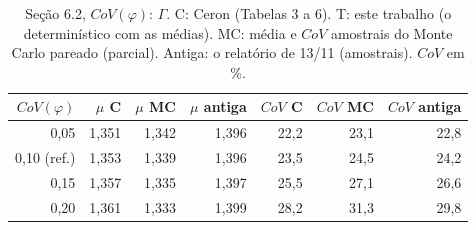 \begin{table}[htbp]\centering\scriptsize\setlength{\tabcolsep}{3pt}
\caption{Seção 6.2, $CoV(\varphi)$: $\Gamma$. C: Ceron (Tabelas 3 a 6). T: este trabalho (o determinístico com as médias). MC: média e $CoV$ amostrais do Monte Carlo pareado (parcial). Antiga: o relatório de 13/11 (amostrais). $CoV$ em \%.}\label{tab:g_covphi}
\begin{tabular}{rrrrrrr}\toprule
$CoV(\varphi)$ & $\mu$ C & $\mu$ MC & $\mu$ antiga & $CoV$ C & $CoV$ MC & $CoV$ antiga \\\midrule
0{,}05 & 1{,}351 & 1{,}342 & 1{,}396 & 22{,}2 & 23{,}1 & 22{,}8 \\
0{,}10 (ref.) & 1{,}353 & 1{,}339 & 1{,}396 & 23{,}5 & 24{,}5 & 24{,}2 \\
0{,}15 & 1{,}357 & 1{,}335 & 1{,}397 & 25{,}5 & 27{,}1 & 26{,}6 \\
0{,}20 & 1{,}361 & 1{,}333 & 1{,}399 & 28{,}2 & 31{,}3 & 29{,}8 \\
\bottomrule\end{tabular}\end{table}
